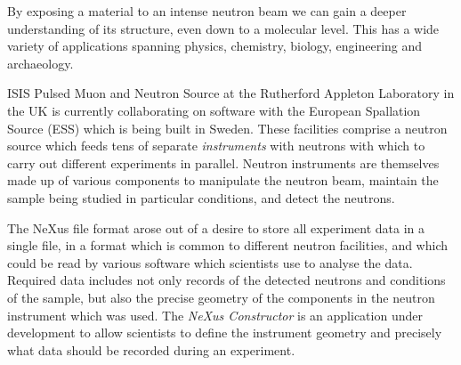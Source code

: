\iffalse
The NeXus file format arose out of a desire to describe the configurations of neutron, muon, and X-ray experiments in a way that is ``facility-neutral." A shared data format has a number of advantages such as reducing the need for conversion tools and fostering cooperation in software development across different facilities. However, the format is not particularly easy to work with for the uninitiated. This can be especially frustrating to scientists who would much rather get their data and get on with their day. The NeXus Constructor, a tool being developed by software developers based at ISIS Pulsed Muon and Neutron Source in the UK and the European Spallation Source (ESS) in Sweden, attempts to address this problem by providing an interface for users to easily examine and modify the contents of NeXus files.
\fi
By exposing a material to an intense neutron beam we can gain a deeper understanding of its structure, even down to a molecular level. This has a wide variety of applications spanning physics, chemistry, biology, engineering and archaeology.

ISIS Pulsed Muon and Neutron Source at the Rutherford Appleton Laboratory in the UK is currently collaborating on software with the European Spallation Source (ESS) which is being built in Sweden. These facilities comprise a neutron source which feeds tens of separate \textit{instruments} with neutrons with which to carry out different experiments in parallel. Neutron instruments are themselves made up of various components to manipulate the neutron beam, maintain the sample being studied in particular conditions, and detect the neutrons.

The NeXus file format arose out of a desire to store all experiment data in a single file, in a format which is common to different neutron facilities, and which could be read by various software which scientists use to analyse the data. Required data includes not only records of the detected neutrons and conditions of the sample, but also the precise geometry of the components in the neutron instrument which was used. The \textit{NeXus Constructor} is an application under development to allow scientists to define the instrument geometry and precisely what data should be recorded during an experiment.
